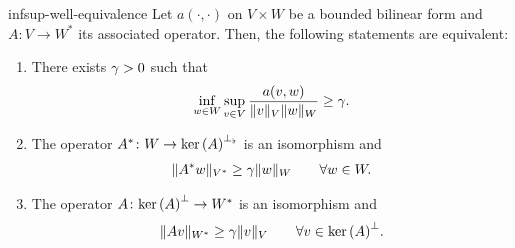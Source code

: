 \begin{Theorem}{infsup-well-equivalence}
  Let $a(\cdot,\cdot)$ on $V\times W$ be a bounded bilinear form %
  and $A\colon V\to W^*$ its associated operator.
  Then, the following statements are equivalent:
  \begin{enumerate}
  \item There exists $\gamma>0$ such that
    \begin{gather}
      \label{eq:infsup:11}
      \inf_{w\in W}\sup_{v\in V}
      \frac{a(v,w)}{\lVert v\rVert_V\lVert w\rVert_W}
      \ge \gamma.
    \end{gather}
  \item The operator $A^*\colon W\to {\operatorname{ker}\left(A\right)}^{\perp_\flat}$ is an isomorphism and
    \begin{gather}
      \label{eq:infsup:12}
      \lVert A^* w\rVert_{V^*} \ge \gamma \lVert w\rVert_{W} \qquad\forall w\in W.
    \end{gather}
  \item The operator $A\colon {\operatorname{ker}\left(A\right)}^\perp\to W^*$ is an isomorphism
    and
    \begin{gather}
      \label{eq:infsup:13}
      \lVert Av\rVert_{W^*} \ge \gamma\lVert v\rVert_V\qquad \forall v\in {\operatorname{ker}\left(A\right)}^\perp.
    \end{gather}
  \end{enumerate}
\end{Theorem}

